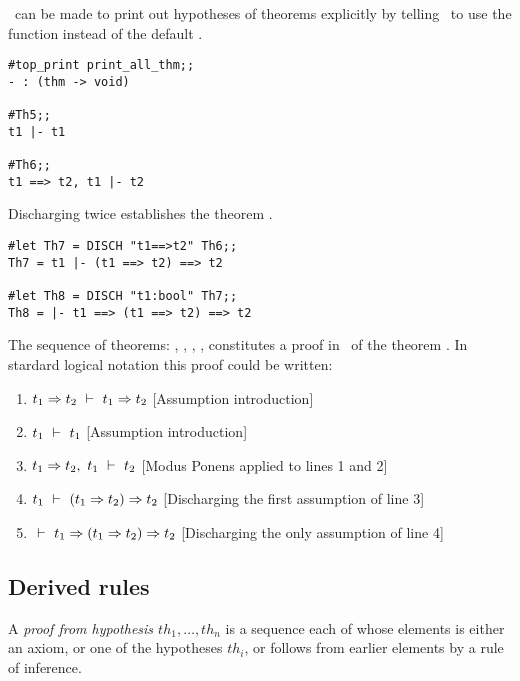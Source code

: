\HOL\ can be made to print out hypotheses of theorems explicitly by
telling \ML\ to use the function  instead of
the default . 

\begin{session}\begin{verbatim}
#top_print print_all_thm;;
- : (thm -> void)

#Th5;;
t1 |- t1

#Th6;;
t1 ==> t2, t1 |- t2
\end{verbatim}\end{session}


\noindent Discharging  twice establishes the theorem
.

\begin{session}\begin{verbatim}
#let Th7 = DISCH "t1==>t2" Th6;;
Th7 = t1 |- (t1 ==> t2) ==> t2

#let Th8 = DISCH "t1:bool" Th7;;
Th8 = |- t1 ==> (t1 ==> t2) ==> t2
\end{verbatim}\end{session}

The sequence of theorems: ,
, , ,  constitutes a proof in \HOL\ of
the theorem . In stardard logical notation this
proof could be written:

\begin{enumerate}
\item $ t_1\Rightarrow t_2\ \vdash\  t_1\Rightarrow t_2$ \hfill
[Assumption introduction]
\item $ t_1\ \vdash\  t_1$ \hfill
[Assumption introduction]
\item $t_1\Rightarrow t_2,\ t_1 \ \vdash\  t_2 $ \hfill
[Modus Ponens applied to lines 1 and 2]
\item $t_1 \ \vdash\  (t_1\Rightarrow t_2)\Rightarrow t_2$ \hfill
[Discharging the first assumption of line 3]
\item $\ \vdash\  t_1 \Rightarrow (t_1 \Rightarrow t_2) \Rightarrow t_2$ \hfill
[Discharging the only assumption of line 4]
\end{enumerate}

\subsection{Derived rules}


A {\it proof from hypothesis $th_1, \ldots, th_n$} is a sequence each of whose
elements is either an axiom, or one of the hypotheses $th_i$, or follows from
earlier elements by a rule of inference.

